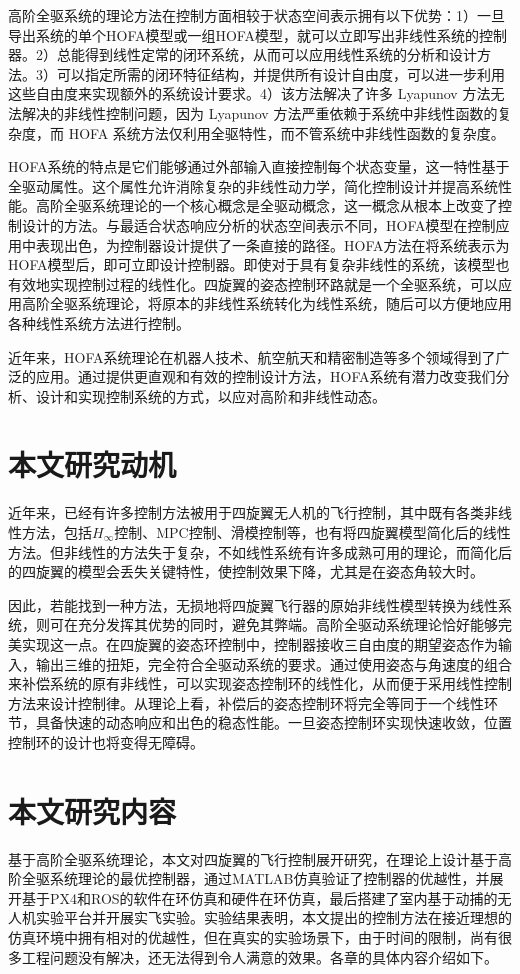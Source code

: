 高阶全驱系统的理论方法在控制方面相较于状态空间表示拥有以下优势：1）一旦导出系统的单个HOFA模型或一组HOFA模型，就可以立即写出非线性系统的控制器。2）总能得到线性定常的闭环系统，从而可以应用线性系统的分析和设计方法。3）可以指定所需的闭环特征结构，并提供所有设计自由度，可以进一步利用这些自由度来实现额外的系统设计要求。4）该方法解决了许多 Lyapunov 方法无法解决的非线性控制问题，因为 Lyapunov 方法严重依赖于系统中非线性函数的复杂度，而 HOFA 系统方法仅利用全驱特性，而不管系统中非线性函数的复杂度。

HOFA系统的特点是它们能够通过外部输入直接控制每个状态变量，这一特性基于全驱动属性。这个属性允许消除复杂的非线性动力学，简化控制设计并提高系统性能。高阶全驱系统理论的一个核心概念是全驱动概念，这一概念从根本上改变了控制设计的方法。与最适合状态响应分析的状态空间表示不同，HOFA模型在控制应用中表现出色，为控制器设计提供了一条直接的路径。HOFA方法在将系统表示为HOFA模型后，即可立即设计控制器。即使对于具有复杂非线性的系统，该模型也有效地实现控制过程的线性化。四旋翼的姿态控制环路就是一个全驱系统，可以应用高阶全驱系统理论，将原本的非线性系统转化为线性系统，随后可以方便地应用各种线性系统方法进行控制。

近年来，HOFA系统理论在机器人技术、航空航天和精密制造等多个领域得到了广泛的应用。通过提供更直观和有效的控制设计方法，HOFA系统有潜力改变我们分析、设计和实现控制系统的方式，以应对高阶和非线性动态。
\section{本文研究动机}
近年来，已经有许多控制方法被用于四旋翼无人机的飞行控制，其中既有各类非线性方法，包括$H_\infty$控制\cite{H}、MPC控制\cite{MPC}、滑模控制\cite{sliding}等，也有将四旋翼模型简化后的线性方法\cite{boua2007}。但非线性的方法失于复杂，不如线性系统有许多成熟可用的理论，而简化后的四旋翼的模型会丢失关键特性，使控制效果下降，尤其是在姿态角较大时。

因此，若能找到一种方法，无损地将四旋翼飞行器的原始非线性模型转换为线性系统，则可在充分发挥其优势的同时，避免其弊端。高阶全驱动系统理论恰好能够完美实现这一点。在四旋翼的姿态环控制中，控制器接收三自由度的期望姿态作为输入，输出三维的扭矩，完全符合全驱动系统的要求。通过使用姿态与角速度的组合来补偿系统的原有非线性，可以实现姿态控制环的线性化，从而便于采用线性控制方法来设计控制律。从理论上看，补偿后的姿态控制环将完全等同于一个线性环节，具备快速的动态响应和出色的稳态性能。一旦姿态控制环实现快速收敛，位置控制环的设计也将变得无障碍。
\section{本文研究内容}
基于高阶全驱系统理论，本文对四旋翼的飞行控制展开研究，在理论上设计基于高阶全驱系统理论的最优控制器，通过MATLAB仿真验证了控制器的优越性，并展开基于PX4和ROS的软件在环仿真和硬件在环仿真，最后搭建了室内基于动捕的无人机实验平台并开展实飞实验。实验结果表明，本文提出的控制方法在接近理想的仿真环境中拥有相对的优越性，但在真实的实验场景下，由于时间的限制，尚有很多工程问题没有解决，还无法得到令人满意的效果。各章的具体内容介绍如下。

